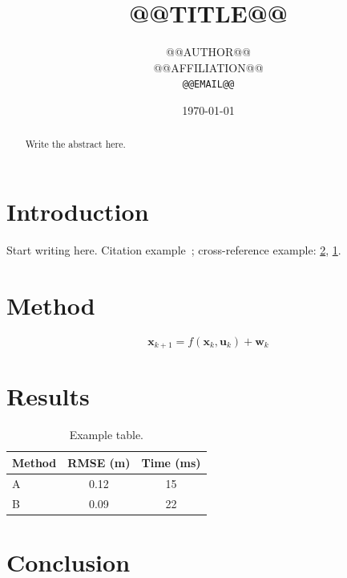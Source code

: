 \documentclass[11pt,a4paper]{article}
\title{@@TITLE@@}
\author{@@AUTHOR@@\\[2pt]
  \small @@AFFILIATION@@\\
  \small\texttt{@@EMAIL@@}}
\date{\today}
\begin{document}
\maketitle

\begin{abstract}
Write the abstract here.
\end{abstract}

\section{Introduction}\label{sec:intro}
Start writing here. Citation example~\cite{lamport1994latex}; cross-reference
example: \cref{sec:method}, \cref{tab:example}.

\section{Method}\label{sec:method}
\begin{equation}
  \mathbf{x}_{k+1} = f(\mathbf{x}_k, \mathbf{u}_k) + \mathbf{w}_k
  \label{eq:model}
\end{equation}


\section{Results}\label{sec:results}
\begin{table}[t]
  \centering
  \caption{Example table.}\label{tab:example}
  \begin{tabular}{lcc}
    \toprule
    Method & RMSE (\si{\metre}) & Time (\si{\milli\second}) \\
    \midrule
    A & 0.12 & 15 \\
    B & 0.09 & 22 \\
    \bottomrule
  \end{tabular}
\end{table}

\section{Conclusion}\label{sec:conclusion}



\end{document}
